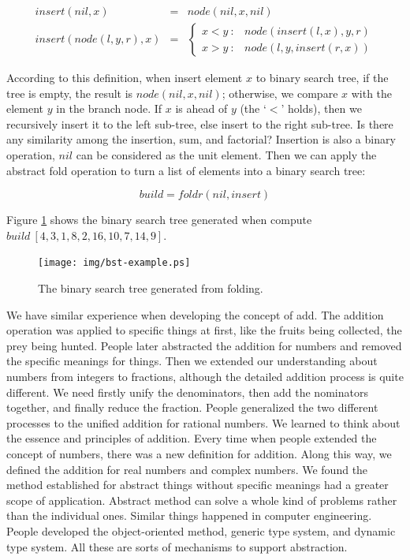\documentclass[b5paper]{article}
\begin{document}
\[
\begin{array}{rcl}
  insert(nil, x) & = & node(nil, x, nil) \\
  insert(node(l, y, r), x) & = & \left.
  \begin{cases}
  x < y\ : & node(insert(l, x), y, r) \\
  x > y\ : & node(l, y, insert(r, x))
  \end{cases} \right.
\end{array}
\label{eq:BST-insert}
\]

According to this definition, when insert element $x$ to binary search tree, if the tree is empty, the result is $node(nil, x, nil)$; otherwise, we compare $x$ with the element $y$ in the branch node. If $x$ is ahead of $y$ (the `$<$' holds), then we recursively insert it to the left sub-tree, else insert to the right sub-tree. Is there any similarity among the insertion, sum, and factorial? Insertion is also a binary operation, $nil$ can be considered as the unit element. Then we can apply the abstract fold operation to turn a list of elements into a binary search tree:

\[
build = foldr(nil, insert)
\]

Figure \ref{fig:bst-example} shows the binary search tree generated when compute $build\ [4, 3, 1, 8, 2, 16, 10, 7, 14, 9]$.

\begin{figure}[htbp]
  \centering
  \texttt{[image: img/bst-example.ps]}
  \caption{The binary search tree generated from folding.}
  \label{fig:bst-example}
\end{figure}

We have similar experience when developing the concept of add. The addition operation was applied to specific things at first, like the fruits being collected, the prey being hunted. People later abstracted the addition for numbers and removed the specific meanings for things. Then we extended our understanding about numbers from integers to fractions, although the detailed addition process is quite different. We need firstly unify the denominators, then add the nominators together, and finally reduce the fraction. People generalized the two different processes to the unified addition for rational numbers. We learned to think about the essence and principles of addition. Every time when people extended the concept of numbers, there was a new definition for addition. Along this way, we defined the addition for real numbers and complex numbers. We found the method established for abstract things without specific meanings had a greater scope of application. Abstract method can solve a whole kind of problems rather than the individual ones. Similar things happened in computer engineering. People developed the object-oriented method, generic type system, and dynamic type system. All these are sorts of mechanisms to support abstraction.
\end{document}
